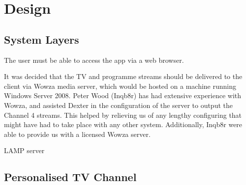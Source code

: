 \section{Design}

\subsection{System Layers}
The user must be able to access the app via a web browser.

It was decided that the TV and programme streams should be delivered to the client via Wowza media server, which would be hosted on a machine running Windows Server 2008. Peter Wood (Inqb8r) has had extensive experience with Wowza, and assisted Dexter in the configuration of the server to output the Channel 4 streams. This helped by relieving us of any lengthy configuring that might have had to take place with any other system. Additionally, Inqb8r were able to provide us with a licensed Wowza server.

LAMP server

\subsection{Personalised TV Channel}

